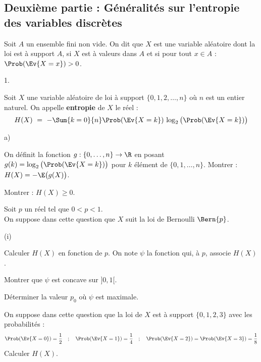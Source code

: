 \documentclass[11pt]{article}%
\begin{document}
\newpage


\subsection*{Deuxième partie : Généralités sur l'entropie des
  variables discrètes}

\noindent
Soit $A$ un ensemble fini non vide. On dit que $X$ est une variable
aléatoire dont la loi est à support $A$, si $X$ est à valeurs dans $A$
et si pour tout $x \in A$ : $\Prob(\Ev{X = x}) >0$.
\begin{noliste}{1.}
  \setlength{\itemsep}{4mm}
  \setcounter{enumi}{5}
\item Soit $X$ une variable aléatoire de loi à support $\{0,1,2,
  \ldots, n\}$ où $n$ est un entier naturel. On appelle {\bf entropie}
  de $X$ le réel :
  \[
    H(X) \ = \ - \Sum{k=0}{n} \Prob(\Ev{X = k}) \, \log_2\big(
    \Prob(\Ev{X = k})\big)
  \]
  \begin{noliste}{a)}
    \setlength{\itemsep}{2mm}
  \item On définit la fonction $g : \{0, \ldots,n\} \to \R$ en posant
    $g(k) = \log_2 \big( \Prob(\Ev{X = k}) \big)$ pour $k$ élément de
    $\{0, 1, \ldots, n\}$. Montrer : $H(X) = - \E \big(g(X)\big)$.
    
  \item Montrer : $H(X) \geq 0$.
    
  \item Soit $p$ un réel tel que $0 < p < 1$.\\
    On suppose dans cette
    question que $X$ suit la loi de Bernoulli $\Bern{p}$.
    \begin{nonoliste}{(i)}
      \setlength{\itemsep}{2mm}
    \item Calculer $H(X)$ en fonction de $p$. On note $\psi$ la
      fonction qui, à $p$, associe $H(X)$.
      
    \item Montrer que $\psi$ est concave sur $]0,1[$.
      
    \item Déterminer la valeur $p_0$ où $\psi$ est maximale.
    \end{nonoliste}
    
  \item On suppose dans cette question que la loi de $X$ est à support
    $\{0,1,2,3\}$ avec les probabilités :
    \[
      \Prob(\Ev{X = 0}) = \dfrac{1}{2} \quad ; \quad \Prob(\Ev{X = 1})
      = \dfrac{1}{4} \quad ; \quad \Prob(\Ev{X = 2}) = \Prob(\Ev{X =
        3}) = \dfrac{1}{8}
    \]
    Calculer $H(X)$.
  \end{noliste}
  

\end{noliste}
\end{document}
